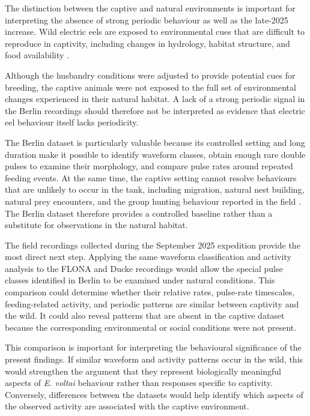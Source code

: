 The distinction between the captive and natural environments is important for interpreting the absence of strong periodic behaviour as well as the late-2025 increase. 
Wild electric eels are exposed to environmental cues that are difficult to reproduce in captivity, including changes in hydrology, habitat structure, and food availability \parencite{assunccao1995reproduction, bastos2020historia}.

Although the husbandry conditions were adjusted to provide potential cues for breeding, the captive animals were not exposed to the full set of environmental changes experienced in their natural habitat. 
A lack of a strong periodic signal in the Berlin recordings should therefore not be interpreted as evidence that electric eel behaviour itself lacks periodicity.

The Berlin dataset is particularly valuable because its controlled setting and long duration make it possible to identify waveform classes, obtain enough rare double pulses to examine their morphology, and compare pulse rates around repeated feeding events. 
At the same time, the captive setting cannot resolve behaviours that are unlikely to occur in the tank, including migration, natural nest building, natural prey encounters, and the group hunting behaviour reported in the field \parencite{bastos2021social}. 
The Berlin dataset therefore provides a controlled baseline rather than a substitute for observations in the natural habitat.

The field recordings collected during the September 2025 expedition provide the most direct next step. 
Applying the same waveform classification and activity analysis to the FLONA and Ducke recordings would allow the special pulse classes identified in Berlin to be examined under natural conditions.
This comparison could determine whether their relative rates, pulse-rate timescales, feeding-related activity, and periodic patterns are similar between captivity and the wild. 
It could also reveal patterns that are absent in the captive dataset because the corresponding environmental or social conditions were not present.

This comparison is important for interpreting the behavioural significance of the present findings. 
If similar waveform and activity patterns occur in the wild, this would strengthen the argument that they represent biologically meaningful aspects of \textit{E. voltai} behaviour rather than responses specific to captivity. 
Conversely, differences between the datasets would help identify which aspects of the observed activity are associated with the captive environment.

